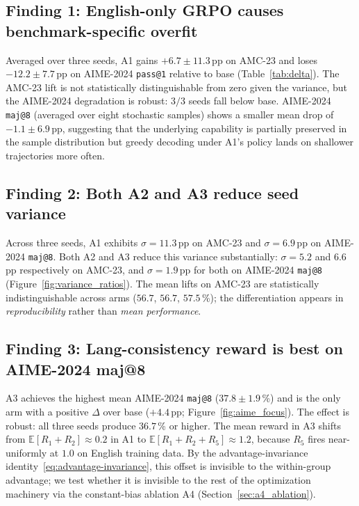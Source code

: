 \documentclass[11pt]{article}
\newcommand{\armA}{\textsc{A1}}
\newcommand{\armB}{\textsc{A2}}
\newcommand{\armC}{\textsc{A3}}
\newcommand{\armD}{\textsc{A4}}
\newcommand{\R}[1]{R_{#1}}
\newcommand{\E}{\mathbb{E}}
\begin{document}
\subsection{Finding 1: English-only GRPO causes benchmark-specific overfit}
\label{sec:finding1}
Averaged over three seeds, \armA{} gains $+6.7 \pm 11.3$\,pp on AMC-23
and loses $-12.2 \pm 7.7$\,pp on AIME-2024 \texttt{pass@1} relative to
base (Table~\ref{tab:delta}). The AMC-23 lift is not statistically
distinguishable from zero given the variance, but the AIME-2024
degradation is robust: $3/3$ seeds fall below base. AIME-2024
\texttt{maj@8} (averaged over eight stochastic samples) shows a smaller
mean drop of $-1.1 \pm 6.9$\,pp, suggesting that the underlying
capability is partially preserved in the sample distribution but greedy
decoding under \armA{}'s policy lands on shallower trajectories more
often.

\subsection{Finding 2: Both \armB{} and \armC{} reduce seed variance}
\label{sec:finding2}
Across three seeds, \armA{} exhibits $\sigma{=}11.3$\,pp on AMC-23 and
$\sigma{=}6.9$\,pp on AIME-2024 \texttt{maj@8}. Both \armB{} and
\armC{} reduce this variance substantially: $\sigma{=}5.2$ and
$6.6$\,pp respectively on AMC-23, and $\sigma{=}1.9$\,pp for both on
AIME-2024 \texttt{maj@8} (Figure~\ref{fig:variance_ratios}). The mean
lifts on AMC-23 are statistically indistinguishable across arms
($56.7$, $56.7$, $57.5$\,\%); the differentiation appears in
\emph{reproducibility} rather than \emph{mean performance}.

\subsection{Finding 3: Lang-consistency reward is best on AIME-2024 maj@8}
\label{sec:finding3}
\armC{} achieves the highest mean AIME-2024 \texttt{maj@8}
($37.8 \pm 1.9$\,\%) and is the only arm with a positive $\Delta$ over
base ($+4.4$\,pp; Figure~\ref{fig:aime_focus}). The effect is robust:
all three seeds produce $36.7$\,\% or higher. The mean reward in
\armC{} shifts from $\E[\R{1}{+}\R{2}]\approx 0.2$ in \armA{} to
$\E[\R{1}{+}\R{2}{+}\R{5}]\approx 1.2$, because $\R{5}$ fires
near-uniformly at $1.0$ on English training data. By the
advantage-invariance identity~\eqref{eq:advantage-invariance}, this
offset is invisible to the within-group advantage; we test whether it
is invisible to the rest of the optimization machinery via the
constant-bias ablation \armD{} (Section~\ref{sec:a4_ablation}).
\end{document}
